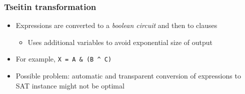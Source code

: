 \documentclass{beamer}
\let\olditem\item
\renewcommand{\item}{%
\olditem\vspace{4pt}}
\begin{document}
\begin{frame}
\frametitle{Tseitin transformation}
\begin{itemize}
\item Expressions are converted to a \emph{boolean circuit} and then to clauses
\begin{itemize}
	\item Uses additional variables to avoid exponential size of output
\end{itemize}
\item For example, \texttt{X = A \& (B \^{} C)}
\end{itemize}
\begin{center}
\resizebox{0.75\textwidth}{!}{
  
}
\end{center}
\begin{itemize}
\item Possible problem: automatic and transparent conversion of expressions to SAT instance might not be optimal
\end{itemize}
\end{frame}
\end{document}
